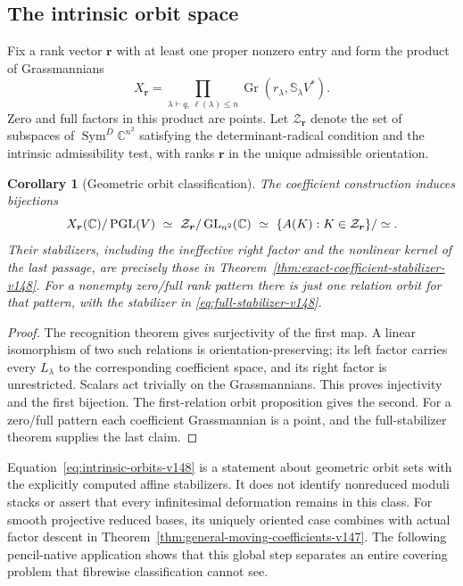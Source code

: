 \documentclass[11pt,reqno]{amsart}
\numberwithin{equation}{section}
\newtheorem{corollary}[theorem]{Corollary}
\theoremstyle{definition}\newtheorem{definition}[theorem]{Definition}
\theoremstyle{remark}\newtheorem{remark}[theorem]{Remark}
\newcommand{\C}{\mathbb C}\newcommand{\Q}{\mathbb Q}
\DeclareMathOperator{\Sym}{Sym}\DeclareMathOperator{\Gr}{Gr}
\begin{document}
\subsection{The intrinsic orbit space}
Fix a rank vector \(\boldsymbol r\) with at least one proper
nonzero entry and form the product of Grassmannians
\[
 X_{\boldsymbol r}=
   \prod_{\lambda\vdash q,\,\ell(\lambda)\le n}
       \Gr(r_\lambda,\mathbb S_\lambda V^*).
\]
Zero and full factors in this product are points.  Let
\(\mathcal Z_{\boldsymbol r}\) denote the set of subspaces of
\(\Sym^D\C^{n^2}\) satisfying the determinant-radical condition
and the intrinsic admissibility test, with ranks
\(\boldsymbol r\) in the unique admissible orientation.

\begin{corollary}[Geometric orbit classification]
\label{cor:intrinsic-orbits-v148}
The coefficient construction induces bijections
\begin{equation}\label{eq:intrinsic-orbits-v148}
 X_{\boldsymbol r}(\C)/\PGL(V)
  \ \simeq\ \mathcal Z_{\boldsymbol r}/\operatorname{GL}_{n^2}(\C)
  \ \simeq\ \{A(K):K\in\mathcal Z_{\boldsymbol r}\}/\simeq.
\end{equation}
Their stabilizers, including the ineffective right factor and the
nonlinear kernel of the last passage, are precisely those in
Theorem~\ref{thm:exact-coefficient-stabilizer-v148}.
For a nonempty zero/full rank pattern there is just one relation
orbit for that pattern, with the stabilizer in
\eqref{eq:full-stabilizer-v148}.
\end{corollary}
\begin{proof}
The recognition theorem gives surjectivity of the first map.
A linear isomorphism of two such relations is orientation-preserving;
its left factor carries every \(L_\lambda\) to the corresponding
coefficient space, and its right factor is unrestricted.  Scalars
act trivially on the Grassmannians.  This proves injectivity and
the first bijection.  The first-relation orbit proposition gives
the second.  For a zero/full pattern each coefficient Grassmannian
is a point, and the full-stabilizer theorem supplies the last claim.
\end{proof}

Equation~\eqref{eq:intrinsic-orbits-v148} is a statement about
geometric orbit sets with the explicitly computed affine
stabilizers.  It does not identify nonreduced moduli stacks or
assert that every infinitesimal deformation remains in this class.
For smooth projective reduced bases, its uniquely oriented case
combines with actual factor descent in
Theorem~\ref{thm:general-moving-coefficients-v147}.  The following
pencil-native application shows that this global step separates an
entire covering problem that fibrewise classification cannot see.
\end{document}

